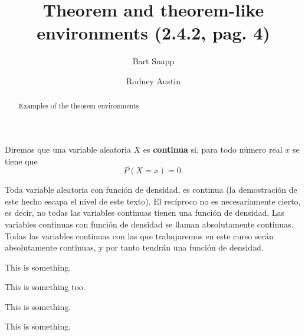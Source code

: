 \documentclass{ximera}
\author{Bart Snapp \and Rodney Austin}
\title[Examples:]{Theorem and theorem-like environments (2.4.2, pag. 4)}
\begin{document}

\begin{abstract}
  Examples of the theorem environments
\end{abstract}
\maketitle


\lipsum[1]
%
\begin{dfn}
	Diremos que una variable aleatoria $X$ es {\bfseries continua} si, para todo número real $x$ se tiene que 
	\[
		P(X=x)=0.
	\]
\end{dfn}


\lipsum[1]

\begin{thm}[título]
	Toda variable aleatoria con función de densidad, es continua (la demostración de este hecho escapa el nivel de este texto). El recíproco no es necesariamente cierto, es decir, no todas las variables continuas tienen una función de densidad. Las variables continuas con función de densidad se llaman absolutamente continuas. Todas las variables continuas con las que trabajaremos en este curso serán absolutamente continuas, y por tanto tendrán una función de densidad. 
\end{thm}

\lipsum[1]


\begin{prp}
	\lipsum[1]
\end{prp}


\begin{theorem}
  This is something.%
\end{theorem}
%

\begin{theorem}[My theorem]
  This is something too.
\end{theorem}

\begin{algorithm}
  This is something.
\end{algorithm}

\begin{axiom}
  This is something.
\end{axiom}
\end{document}
